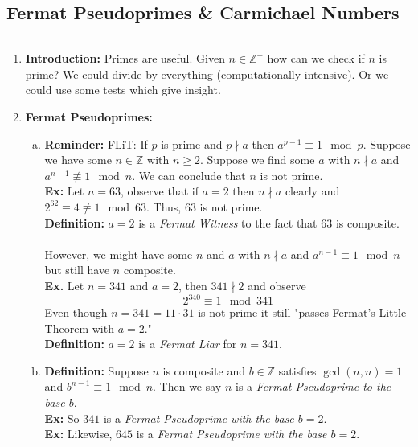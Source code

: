 \documentclass[class=article, crop=false]{standalone}
\def\integers{{\mathbb Z}}
\begin{document}
\subsection{Fermat Pseudoprimes \& Carmichael Numbers}
\rule{\textwidth}{1pt}
\begin{enumerate}[1.]
	\item \textbf{Introduction:}
	Primes are useful. Given $n\in\integers^+$ how can we check if $n$ is prime?
	We could divide by everything (computationally intensive).
	Or we could use some tests which give insight.
	
	\item \textbf{Fermat Pseudoprimes:}
		\begin{enumerate}[(a)]
			\item \textbf{Reminder:}
				FLiT: If $p$ is prime and $p\nmid a$ then $a^{p-1}\equiv 1\mod p$.
				Suppose we have some $n\in\integers$ with $n\geq 2$. Suppose we find
				some $a$ with $n\nmid a$ and $a^{n-1}\not\equiv 1\mod n$. We can
				conclude that $n$ is not prime.\\
				\textbf{Ex:}
				Let $n=63$, observe that if $a=2$ then $n\nmid a$ clearly and
				$2^{62}\equiv 4\not\equiv 1\mod 63$. Thus, $63$ is not prime.\\
				\textbf{Definition:} $a=2$ is a \emph{Fermat Witness} to the fact that
				$63$ is composite.\\\\
				However, we might have some $n$ and $a$ with $n\nmid a$ and $a^{n-1}\equiv 1\mod n$
				but still have $n$ composite.\\
				\textbf{Ex.} Let $n=341$ and $a=2$, then $341\nmid 2$ and observe
				$$2^{340} \equiv 1\mod 341$$
				Even though $n=341=11\cdot 31$ is not prime it still "passes Fermat's
				Little Theorem with $a=2$."\\
				\textbf{Definition:} $a=2$ is a \emph{Fermat Liar} for $n=341$.

			\item \textbf{Definition:} 
				Suppose $n$ is composite and $b\in\integers$ satisfies
				$\gcd(n,n)=1$ and $b^{n-1}\equiv 1\mod n$. 
				Then we say $n$ is a \emph{Fermat Pseudoprime to the base $b$}.\\
				\textbf{Ex:} So $341$ is a \emph{Fermat Pseudoprime with the base $b=2$}.\\
				\textbf{Ex:} Likewise, $645$ is a \emph{Fermat Pseudoprime with the base $b=2$}.
		\end{enumerate}
	

\end{enumerate}
\end{document}
